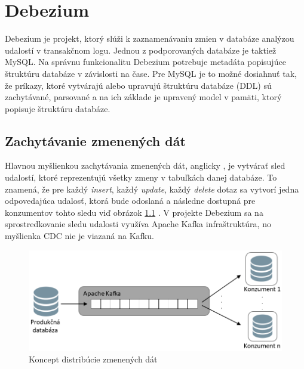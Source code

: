 \chapter{Debezium}
Debezium\cite{Debezium} je projekt, ktorý slúži k zaznamenávaniu zmien v databáze analýzou udalostí v transakčnom logu. Jednou z podporovaných databáze je taktiež MySQL. Na správnu funkcionalitu Debezium potrebuje metadáta popisujúce štruktúru databáze v závislosti na čase. Pre MySQL je to možné dosiahnuť tak, že príkazy, ktoré vytvárajú alebo upravujú štruktúru databáze (DDL) sú zachytávané, parsované a na ich základe je upravený model v pamäti, ktorý popisuje štruktúru databáze.

\section{Zachytávanie zmenených dát}
Hlavnou myšlienkou zachytávania zmenených dát, anglicky , je vytvárať sled udalostí, ktoré reprezentujú všetky zmeny v tabuľkách danej databáze. To znamená, že pre každý \textit{insert}, každý \textit{update}, každý \textit{delete} dotaz sa vytvorí jedna odpovedajúca udalosť, ktorá bude odoslaná a následne dostupná pre konzumentov tohto sledu viď obrázok \ref{fig:CDC} \cite{debezium:devoxx}. V projekte Debezium sa na sprostredkovanie sledu udalosti využíva Apache Kafka \cite{Kafka} infraštruktúra, no myšlienka CDC nie je viazaná na Kafku.

\begin{figure}[H]
\begin{center}
\includegraphics[width=15cm]{figures/CDC_1.PNG}
\caption{Koncept distribúcie zmenených dát}
\label{fig:CDC}
\end{center}
\end{figure}

